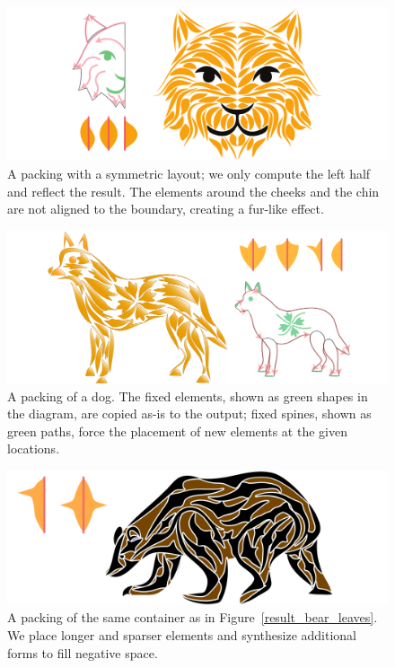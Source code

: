 \begin{figure}
\centering
\includegraphics[width=1.0\textwidth]{figures/flowpak/cat.pdf}
\caption[A packing of a cat]
{A packing with a symmetric layout; we only compute the left half and reflect the result. The elements around the cheeks and the chin are not aligned to the boundary, creating a fur-like effect.}
\label{result_cat}
\end{figure}

\begin{figure}
\centering
\includegraphics[width=1.0\textwidth]{figures/flowpak/dog_flower.pdf}
\caption[A packing of a dog]
{A packing of a dog. The fixed elements, shown as green
  shapes in the diagram, are copied as-is to the output; fixed spines,
  shown as green paths, force the placement of new elements at the given
  locations.}
\label{result_dog}
\end{figure}

\begin{figure}
\centering
\includegraphics[width=1.0\textwidth]{figures/flowpak/bear_offset_space.pdf}
\caption[A packing of a bear with elements created from negative space]
{A packing of the same container as in Figure~\ref{result_bear_leaves}.
  We place longer and sparser elements and synthesize additional forms to
  fill negative space.}
\label{result_bear_offset}
\end{figure}

